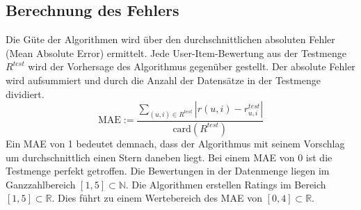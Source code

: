 \subsection{Berechnung des Fehlers}\label{s.error}
Die Güte der Algorithmen wird über den durchschnittlichen absoluten Fehler (Mean Absolute Error) ermittelt. Jede User-Item-Bewertung aus der Testmenge $R^{test}$ wird der Vorhersage des Algorithmus gegenüber gestellt. Der absolute Fehler wird aufsummiert und durch die Anzahl der Datensätze in der Testmenge dividiert.
\begin{equation}
		\mathrm{MAE} := \dfrac{\sum\limits_{(u,i)\in R^{test}}|r(u,i)-r^{test}_{u,i}|}{\mathrm{card}(R^{test})}  	\label{MAE}
\end{equation}
Ein MAE von 1 bedeutet demnach, dass der Algorithmus mit seinem Vorschlag um durchschnittlich einen Stern daneben liegt. Bei einem MAE von 0 ist die Testmenge perfekt getroffen. Die Bewertungen in der Datenmenge liegen im Ganzzahlbereich $[1,5]\subset \mathbb{N}$. Die Algorithmen erstellen Ratings im Bereich $[1,5]\subset \mathbb{R}$. Dies führt zu einem Wertebereich des MAE von $[0,4]\subset \mathbb{R}$.

\clearpage